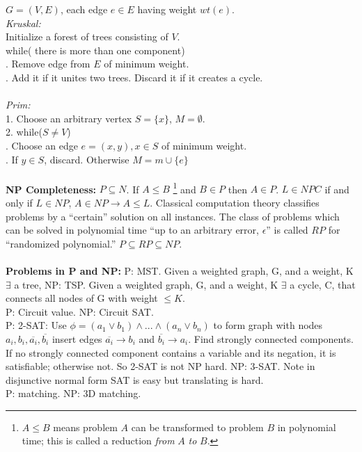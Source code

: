 $G= (V,E)$, each edge $e \in E$ having weight $wt(e)$.  
\\
\emph{Kruskal:}
\\
 Initialize a forest of trees consisting of $V$.\\
while( there is more than one component) \\
. Remove edge from $E$ of minimum weight.\\
. Add it if it unites two trees.  Discard it if it creates a cycle.\\
\\
\emph{Prim:}\\
1. Choose an arbitrary vertex $S= \{x\}$, $M=\emptyset$.\\
2. while($S \ne V$) \\
. Choose an edge $e=(x, y), x \in S$ of minimum weight.\\
. If $y \in S$, discard.  Otherwise $M= m \cup \{e\}$
\\
\\
{\bf NP Completeness:}
$P \subseteq N$.  If $A \le B$ 
\footnote{$A \le B$ means problem $A$ can be transformed to problem $B$ in polynomial time;
this is called a reduction \emph {from} $A$ \emph{to} $B$.}
and $B \in P$ then $A \in P$.  $L \in NPC$ if and only if 
$L \in NP$, $A \in NP \rightarrow A \le L$.  Classical computation theory classifies
problems by a ``certain'' solution on all instances.  The class of problems which
can be solved in polynomial time
``up to an arbitrary error, $\epsilon$'' is called $RP$ for ``randomized
polynomial.''  $P \subseteq RP \subseteq NP$.
\\
\\
{\bf Problems in P and NP:}
P: MST.  Given a weighted graph, G, and a weight, K $\exists$ a tree,
NP: TSP.  Given a weighted graph, G, and a weight, K $\exists$ a cycle,
C, that connects all nodes  of G with weight $\leq K$.\\
P: Circuit value.  NP: Circuit SAT.\\
P: 2-SAT: Use $\phi= (a_1 \vee b_1  )  \wedge ... \wedge (a_n \vee b_n )$ to form graph with 
nodes $a_i, b_i, {\overline {a_i}}, {\overline {b_i}}$ insert
edges ${\overline {a_i}} \rightarrow b_i$
and ${\overline {b_i}} \rightarrow a_i$.  Find strongly connected components.  If no
strongly connected component contains a variable and its negation, it is satisfiable;
otherwise not.  So 2-SAT is not NP hard.  NP: 3-SAT.  Note in disjunctive normal form 
SAT is easy but translating is hard.
\\
P: matching.  NP: 3D matching.\\

